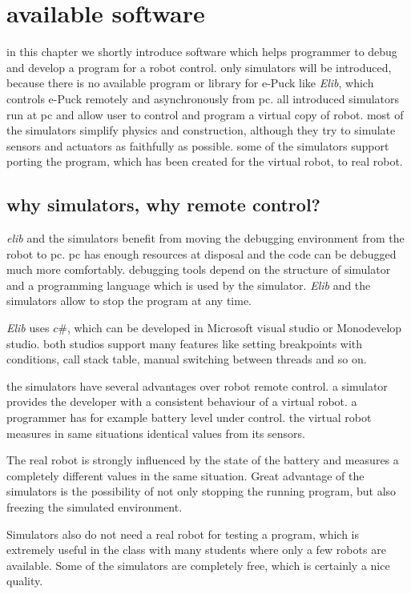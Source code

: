 \chapter{available software} \label{chap:software}
  in this chapter we shortly introduce software which helps programmer
  to debug and develop a program for a robot control. only simulators will be introduced, because 
  there is no available program or library for e-Puck like {\it Elib},
  which controls e-Puck remotely and asynchronously from pc.
  all introduced simulators run at pc and allow user to control and program a virtual copy of robot.
  most of the simulators simplify physics and construction, although they try to simulate sensors
  and actuators as faithfully as possible. some of the simulators support porting the program,
  which has been created for the virtual robot, to real robot.
  
\section{why simulators, why remote control?}
  {\it elib} and the simulators benefit from moving the debugging environment from the robot to pc.
  pc has enough resources at disposal and the code can be debugged much more comfortably. debugging
  tools depend on the structure of simulator and a programming language which is used by the simulator.
  {\it Elib} and the simulators allow to stop the program at any time.
  
  {\it Elib} uses $c\#$, which can be developed in Microsoft visual studio or Monodevelop studio.
  both studios support many features like setting breakpoints with conditions, call stack table,
  manual switching between threads and so on.
  
  the simulators have several advantages over robot remote control.
  a simulator provides the developer with a consistent behaviour of a virtual robot.
  a programmer has for example battery level under control. 
  the virtual robot measures in same situations identical values from its sensors. 
  
  The real robot is strongly influenced by the state of the battery
  and measures a completely different values in the same situation.
  Great advantage of the simulators is the possibility of not only stopping
  the running program, but also freezing the simulated environment. 
  
  Simulators also do not need a real robot for testing a program, which is extremely
  useful in the class with many students where only a few robots are available.
  Some of the simulators are completely free, which is certainly a nice quality.
  

